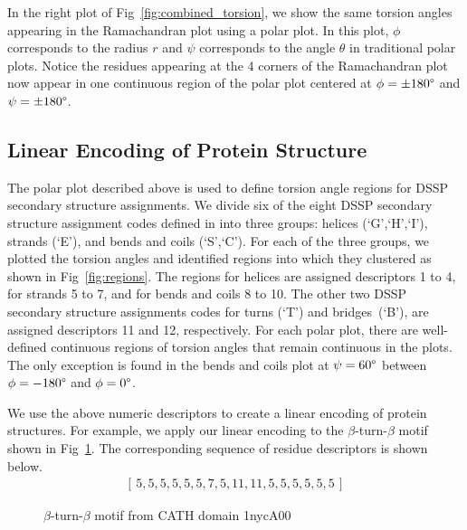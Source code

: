 \documentclass[10pt,letterpaper]{article}
\renewcommand{\figurename}{Fig}
\begin{document}
In the right plot of \figurename~\ref{fig:combined_torsion}, we show the same torsion angles appearing in the Ramachandran plot using a polar plot. 
In this plot, $\phi$ corresponds to the radius $r$ and $\psi$ corresponds to the angle $\theta$ in traditional polar plots. 
Notice the residues appearing at the 4 corners of the Ramachandran plot now appear in one continuous region of the polar plot centered at $\phi = \pm180\degree$ and $\psi = \pm180\degree$. 

\subsection*{Linear Encoding of Protein Structure}

The polar plot described above is used to define torsion angle regions for DSSP secondary structure assignments.
We divide six of the eight DSSP secondary structure assignment codes defined in \cite{Kabsch1983} into three groups: helices (`G',`H',`I'), strands (`E'), and bends and coils (`S',`C').
For each of the three groups, we plotted the torsion angles and identified regions into which they clustered as shown in \figurename~\ref{fig:regions}.
The regions for helices are assigned descriptors 1 to 4, for strands 5 to 7, and for bends and coils 8 to 10. 
The other two DSSP secondary structure assignments codes for turns (`T') and bridges~(`B'), are assigned descriptors 11 and 12, respectively.
For each polar plot, there are well-defined continuous regions of torsion angles that remain continuous in the plots. 
The only exception is found in the bends and coils plot at $\psi = 60\degree$ between $\phi = -180\degree$ and $\phi = 0\degree$.

\begin{figure*}[!h]
\caption{Polar plots of randomly sampled torsion angles with designated descriptors for region and DSSP code combinations}
\label{fig:regions}
\end{figure*}

We use the above numeric descriptors to create a linear encoding of protein structures. 
For example, we apply our linear encoding to the $\beta$-turn-$\beta$ motif shown in \figurename~\ref{fig:beta_turn}.
The corresponding sequence of residue descriptors is shown below.
\begin{gather}\label{E:descrseq} 
    [\, 5, 5, 5, 5, 5, 5, 7, 5, 11, 11, 5, 5, 5, 5, 5, 5 \,]
\end{gather}

\begin{figure}[!h]
\caption{$\beta$-turn-$\beta$ motif from CATH domain 1nycA00}
\label{fig:beta_turn}
\end{figure}
\end{document}
